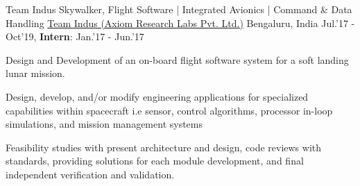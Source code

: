 \begin{cventries}
	\cventry
	{Team Indus Skywalker, Flight Software | Integrated Avionics | Command \& Data Handling}
	{\href{http://www.teamindus.in/}{Team Indus (Axiom Research Labs Pvt. Ltd.)}}
	{Bengaluru, India}
	{Jul.'17 - Oct'19, \textbf{Intern}: Jan.'17 - Jun.'17}
	{
		\begin{cvitems}
			\item{Design and Development of an on-board flight software system for a soft landing lunar mission.}
			\item{Design, develop, and/or modify engineering applications for specialized capabilities within spacecraft i.e sensor, control algorithms, processor in-loop simulations, and mission management systems}
			\item{Feasibility studies with present architecture and design, code reviews with standards, providing solutions for each module development, and final independent verification and validation.}
		\end{cvitems}
	}
\end{cventries}

